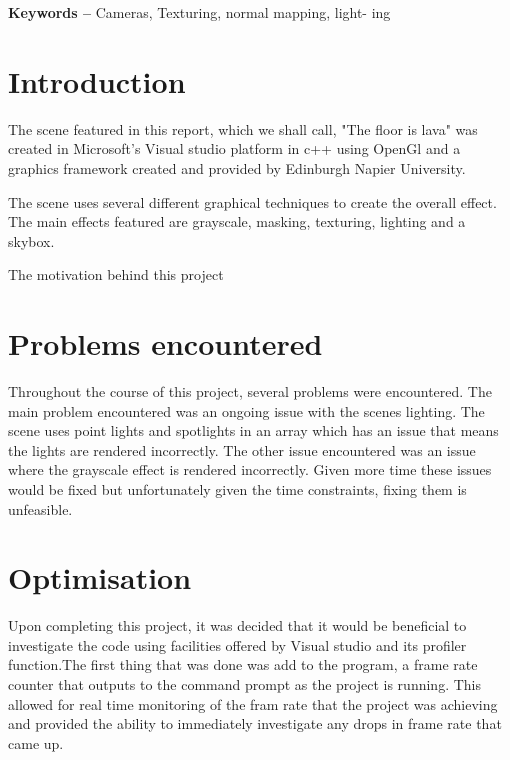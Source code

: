 \documentclass[10pt, a4paper]{article}
\title{\mytitle}
\author{\myauthor\hspace{1em}\\\contact\\Edinburgh Napier University\hspace{0.5em}-\hspace{0.5em}\mymodule}
\date{}
\begin{document}
	\maketitle
	\begin{abstract}
	This report will outline the creation and implementation
	of a graphics coursework project. The aim of this project
	was to create a "the floor is lava" type scene, essentially
	a living room which has a floor made of lava.
	
	\end{abstract}
    
	\textbf{Keywords -- }{Cameras, Texturing, normal mapping, light-
		ing}
	\section{Introduction}
	The scene featured in this report, which we shall call, "The floor is lava" was created in Microsoft's Visual studio platform in c++ using OpenGl and a graphics framework created and provided by Edinburgh Napier University. 
	
	The scene uses several different graphical techniques to create the overall effect. The main effects featured are grayscale, masking, texturing, lighting and a skybox.
	
	The motivation behind this project 
	\section{Problems encountered}
	
Throughout the course of this project, several problems were encountered. The main problem encountered was an ongoing issue with the scenes lighting. The scene uses point lights and spotlights in an array which has an issue that means the lights are rendered incorrectly. The other issue encountered was an issue where the grayscale effect is rendered incorrectly. Given more time these issues would be fixed but unfortunately given the time constraints, fixing them is unfeasible. 
	
\section{Optimisation}
Upon completing this project, it was decided that it would be beneficial to investigate the code using facilities offered by Visual studio and its profiler function.The first thing that was done was add to the program, a frame rate counter that outputs to the command prompt as the project is running. This allowed for real time monitoring of the fram rate that the project was achieving and provided the ability to immediately investigate any drops in frame rate that came up.
\end{document}
